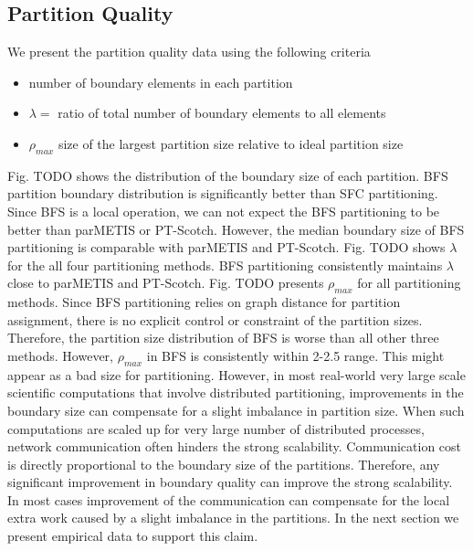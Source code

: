 \documentclass[conference]{IEEEtran}
\begin{document}
\subsection{Partition Quality}
We present the partition quality data using the following criteria
\begin{itemize}
    \item number of boundary elements in each partition 
    \item $\lambda = $ ratio of total number of boundary elements to all elements
    \item $\rho_{max}$ size of the largest partition size relative to ideal partition size
\end{itemize}

Fig. TODO shows the distribution of the boundary size of each partition. BFS partition boundary distribution is significantly better than SFC partitioning. Since BFS is a local operation, we can not expect the BFS partitioning to be better than parMETIS or PT-Scotch. However, the median boundary size of BFS partitioning is comparable with parMETIS and PT-Scotch. Fig. TODO shows $\lambda$ for the all four partitioning methods. BFS partitioning consistently maintains $\lambda$ close to parMETIS and PT-Scotch. Fig. TODO presents $\rho_{max}$ for all partitioning methods. Since BFS partitioning relies on graph distance for partition assignment, there is no explicit control or constraint of the partition sizes. Therefore, the partition size distribution of BFS is worse than all other three methods. However, $\rho_{max}$ in BFS is consistently within 2-2.5 range. This might appear as a bad size for partitioning. However, in most real-world very large scale scientific computations that involve distributed partitioning, improvements in the boundary size can compensate for a slight imbalance in partition size. When such computations are scaled up for very large number of distributed processes, network communication often hinders the strong scalability. Communication cost is directly proportional to the boundary size of the partitions. Therefore, any significant improvement in boundary quality can improve the strong scalability. In most cases improvement of the communication can compensate for the local extra work caused by a slight imbalance in the partitions. In the next section we present empirical data to support this claim.
\end{document}
